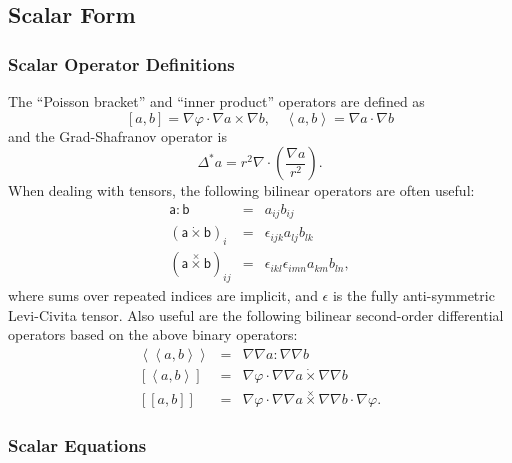 \documentclass[letterpaper]{book}
\newcommand{\tensor}[1]{\mathsf{#1}}
\newcommand{\tor}{\varphi}              %
\newcommand{\grad}[1]{\nabla #1}
\renewcommand{\div}[1]{\nabla \cdot #1}
\newcommand{\dotdot}{:}
\newcommand{\dottimes}{\dot\times}
\newcommand{\timestimes}{\stackrel{\times}{\times}}
\newcommand{\gs}[1]{\Delta^* #1}
\newcommand{\pb}[2]{\left[#1,#2\right]}
\newcommand{\ip}[2]{\left\langle  #1,#2\right\rangle}
\newcommand{\funcss}[2]{
  \left\langle\left\langle #1,#2 \right\rangle\right\rangle}
\newcommand{\funcsa}[2]{\left[\left\langle #1,#2 \right\rangle\right]}
\newcommand{\funcaa}[2]{\left[\left[ #1,#2 \right]\right]}
\begin{document}
\subsection{Scalar Form}

\subsubsection{Scalar Operator Definitions}

The ``Poisson bracket'' and ``inner product'' operators
are defined as
\[ 
\pb{a}{b} = \nabla \tor \cdot \grad{a} \times \grad{b}, 
\quad
\ip{a}{b} = \grad{a} \cdot \grad{b}
\]
and the Grad-Shafranov operator is
\[
\gs{a} = r^2 \div{\left(\frac{\grad{a}}{r^2}\right)}.
\]
When dealing with tensors, the following bilinear operators are often
useful:
\begin{eqnarray*}
  \tensor{a} \dotdot \tensor{b} & = & a_{i j} b_{i j}
  \\
  (\tensor{a} \dottimes \tensor{b})_i & = & \epsilon_{i j k}
  a_{l j} b_{l k}
  \\
  (\tensor{a} \timestimes \tensor{b})_{i j} & = & 
  \epsilon_{i k l} \epsilon_{i m n} a_{k m} b_{l n},
\end{eqnarray*}
where sums over repeated indices are implicit, and $\tensor{\epsilon}$
is the fully anti-symmetric Levi-Civita tensor.  Also useful are the
following bilinear second-order differential operators based on the
above binary operators:
\begin{eqnarray*}
  \funcss{a}{b} & = & \grad{\grad{a}} \dotdot \grad{\grad{b}} \\
  \funcsa{a}{b} & = & \grad{\tor} \cdot 
  \grad{\grad{a}} \dottimes \grad{\grad{b}}\\
  \funcaa{a}{b} & = & \grad{\tor} \cdot 
       \grad{\grad{a}} \timestimes \grad{\grad{b}}
       \cdot \grad{\tor}.
\end{eqnarray*}

\subsubsection{Scalar Equations}
\end{document}
